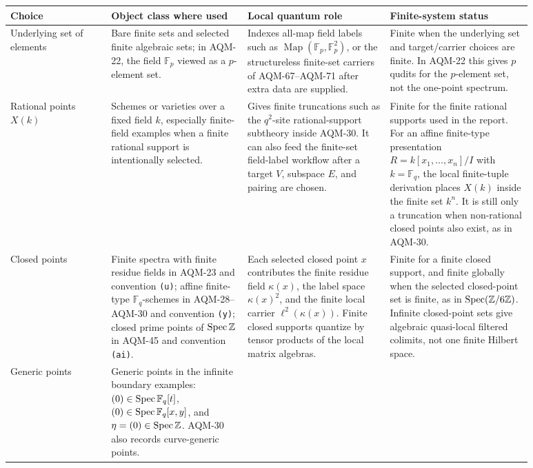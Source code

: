 \begin{center}
\small
\begin{tabular}{p{0.17\linewidth}p{0.23\linewidth}p{0.24\linewidth}p{0.24\linewidth}}
\toprule
Choice & Object class where used & Local quantum role & Finite-system status \\
\midrule
Underlying set of elements &
Bare finite sets and selected finite algebraic sets; in AQM-22, the field
\(\mathbb F_p\) viewed as a \(p\)-element set. &
Indexes all-map field labels such as
\(\operatorname{Map}(\mathbb F_p,\mathbb F_p^2)\), or the structureless
finite-set carriers of AQM-67--AQM-71 after extra data are supplied. &
Finite when the underlying set and target/carrier choices are finite.  In
AQM-22 this gives \(p\) qudits for the \(p\)-element set, not the one-point
spectrum. \\
\addlinespace
Rational points \(X(k)\) &
Schemes or varieties over a fixed field \(k\), especially finite-field
examples when a finite rational support is intentionally selected. &
Gives finite truncations such as the \(q^2\)-site rational-support subtheory
inside AQM-30.  It can also feed the finite-set field-label workflow after a
target \(V\), subspace \(E\), and pairing are chosen. &
Finite for the finite rational supports used in the report.  For an affine
finite-type presentation \(R=k[x_1,\ldots,x_n]/I\) with
\(k=\mathbb F_q\), the local finite-tuple derivation places \(X(k)\) inside
the finite set \(k^n\).  It is still only a truncation when non-rational
closed points also exist, as in AQM-30. \\
\addlinespace
Closed points &
Finite spectra with finite residue fields in AQM-23 and convention
\texttt{(u)}; affine finite-type \(\mathbb F_q\)-schemes in AQM-28--AQM-30
and convention \texttt{(y)}; closed prime points of \(\operatorname{Spec}\mathbb Z\) in
AQM-45 and convention \texttt{(ai)}. &
Each selected closed point \(x\) contributes the finite residue field
\(\kappa(x)\), the label space \(\kappa(x)^2\), and the finite local carrier
\(\ell^2(\kappa(x))\).  Finite closed supports quantize by tensor products of
the local matrix algebras. &
Finite for a finite closed support, and finite globally when the selected
closed-point set is finite, as in \(\operatorname{Spec}(\mathbb Z/6\mathbb Z)\).  Infinite
closed-point sets give algebraic quasi-local filtered colimits, not one
finite Hilbert space. \\
\addlinespace
Generic points &
Generic points in the infinite boundary examples: \((0)\in\operatorname{Spec}\mathbb
F_q[t]\), \((0)\in\operatorname{Spec}\mathbb F_q[x,y]\), and
\(\eta=(0)\in\operatorname{Spec}\mathbb Z\).  AQM-30 also records curve-generic points. &

\end{tabular}
\end{center}
